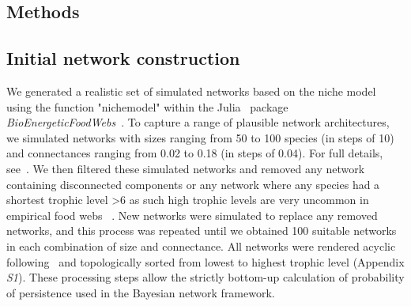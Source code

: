 \documentclass[12pt]{article}
\begin{document}
\begin{spacing}{2.0}
    	
\section*{Methods}

	\subsection*{Initial network construction}

		We generated a realistic set of simulated networks based on the niche model~\citep{Williams2000,Stouffer2007} using the function "nichemodel" within the Julia~\citep{Bezanson2017julia} package \emph{BioEnergeticFoodWebs}~\citep{bioenergfw}. 
		To capture a range of plausible network architectures, we simulated networks with sizes ranging from 50 to 100 species (in steps of 10) and connectances ranging from 0.02 to 0.18 (in steps of 0.04). 
		For full details, see~\citet{Cirtwill2021_inprep}.
        We then filtered these simulated networks and removed any network containing disconnected components
        or any network where any species had a shortest trophic level \textgreater6 as such high trophic levels are very uncommon in empirical food webs ~\citep{Riede2011}.
		New networks were simulated to replace any removed networks, and this process was repeated until we obtained 100 suitable networks in each combination of size and connectance.
		All networks were rendered acyclic following~\citet{Allesina2009} and topologically sorted from lowest to highest trophic level (Appendix \emph{S1}).
		These processing steps allow the strictly bottom-up calculation of probability of persistence used in the Bayesian network framework.
		
		

\end{spacing}
\end{document}
